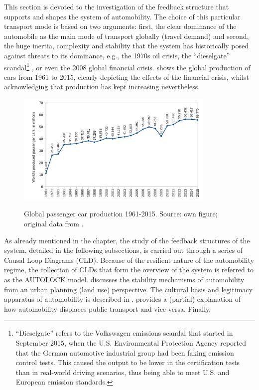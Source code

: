 This section is devoted to the investigation of the feedback structure that supports and shapes the system of automobility. The choice of this particular transport mode is based on two arguments: first, the clear dominance of the automobile as the main mode of transport globally (travel demand) and second, the huge inertia, complexity and stability that the system has historically posed against threats to its dominance, e.g., the 1970s oil crisis, the ``dieselgate'' scandal\footnote{``Dieselgate'' refers to the Volkswagen emissions scandal that started in September 2015, when the U.S. Environmental Protection Agency reported that the German automotive industrial group had been faking emission control tests. This caused the  output to be lower in the certification tests than in real-world driving scenarios, thus being able to meet U.S. and European emission standards.} \parencite{guardian2017_Volkswagenrevealsrecord}, or even the 2008 global financial crisis.  shows the global production of cars from 1961 to 2015, clearly depicting the effects of the financial crisis, whilst acknowledging that production has kept increasing nevertheless.
%
\begin{figure}[h]
\centering
\includegraphics[width=0.85\textwidth]{figures/line_global-car-sales.pdf}
\label{f:results:global-passenger-car-production}
\caption[Global passenger cars production 1961-2015.]{Global passenger car production 1961-2015. Source: own figure; original data from \textcite{bts2017_Table123}.}
\end{figure}

As already mentioned in the  chapter, the study of the feedback structures of the system, detailed in the following subsections, is carried out through a series of Causal Loop Diagrams (CLD). Because of the resilient nature of the automobility regime, the collection of CLDs that form the overview of the system is referred to as the AUTOLOCK model.  discusses the stability mechanisms of automobility from an urban planning (land use) perspective. The cultural basis and legitimacy apparatus of automobility is described in .  provides a (partial) explanation of how automobility displaces public transport and vice-versa. Finally, 

